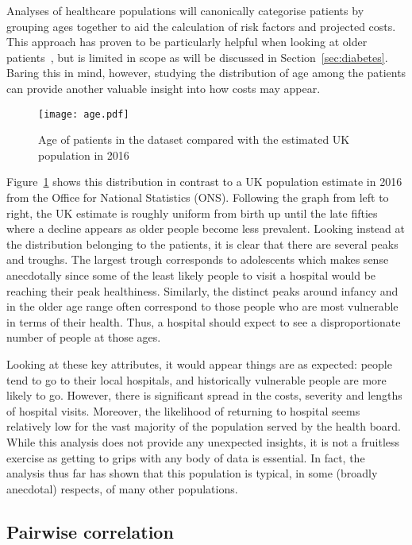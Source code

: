 Analyses of healthcare populations will canonically categorise patients by
grouping ages together to aid the calculation of risk factors and projected
costs. This approach has proven to be particularly helpful when looking at older
patients~\cite{Billings327}, but is limited in scope as will be discussed in
Section~\ref{sec:diabetes}. Baring this in mind, however, studying the
distribution of age among the patients can provide another valuable insight into
how costs may appear.

\begin{figure}
    \centering
    \texttt{[image: age.pdf]}
    \caption{%
        Age of patients in the dataset compared with the estimated UK population
        in 2016
    }\label{fig:age}
\end{figure}

Figure~\ref{fig:age} shows this distribution in contrast to a UK population
estimate in 2016 from the Office for National Statistics (ONS). Following the
graph from left to right, the UK estimate is roughly uniform from birth up until
the late fifties where a decline appears as older people become less prevalent.
Looking instead at the distribution belonging to the patients, it is clear that
there are several peaks and troughs. The largest trough corresponds to
adolescents which makes sense anecdotally since some of the least likely people
to visit a hospital would be reaching their peak healthiness. Similarly, the
distinct peaks around infancy and in the older age range often correspond to
those people who are most vulnerable in terms of their health. Thus, a hospital
should expect to see a disproportionate number of people at those ages.

Looking at these key attributes, it would appear things are as expected: people
tend to go to their local hospitals, and historically vulnerable people are more
likely to go. However, there is significant spread in the costs, severity and
lengths of hospital visits. Moreover, the likelihood of returning to hospital
seems relatively low for the vast majority of the population served by the
health board. While this analysis does not provide any unexpected insights, it
is not a fruitless exercise as getting to grips with any body of data is
essential. In fact, the analysis thus far has shown that this population is
typical, in some (broadly anecdotal) respects, of many other populations.


\subsection{Pairwise correlation}\label{subsec:corr}

